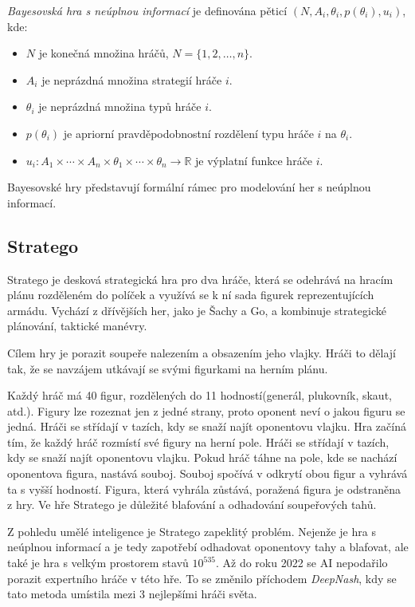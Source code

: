 \emph{Bayesovská hra s neúplnou informací} \cite{Y_Narahari} je definována pěticí $(N, A_i, \theta_i, p(\theta_i), u_i)$, kde:

\begin{itemize}
\item $N$ je konečná množina hráčů, $N = \{1, 2, \ldots, n\}$.
\item $A_i$ je neprázdná množina strategií hráče $i$.
\item $\theta_i$ je neprázdná množina typů hráče $i$.
\item $p(\theta_i)$ je apriorní pravděpodobnostní rozdělení typu hráče $i$ na $\theta_i$.
\item $u_i: A_1 \times \cdots \times A_n \times \theta_1 \times \cdots \times \theta_n \rightarrow \mathbb{R}$ je výplatní funkce hráče $i$.
\end{itemize}

Bayesovské hry představují formální rámec pro modelování her s neúplnou informací.

\subsection*{Stratego}

Stratego je desková strategická hra pro dva hráče, která se odehrává na hracím plánu rozděleném do políček a využívá se k ní sada figurek reprezentujících armádu.
Vychází z dřívějších her, jako je Šachy a Go, a kombinuje strategické plánování, taktické manévry.

Cílem hry je porazit soupeře nalezením a obsazením jeho vlajky.
Hráči to dělají tak, že se navzájem utkávají se svými figurkami na herním plánu.

Každý hráč má 40 figur, rozdělených do 11 hodností(generál, plukovník, skaut, atd.).
Figury lze rozeznat jen z jedné strany, proto oponent neví o jakou figuru se jedná.
Hráči se střídají v tazích, kdy se snaží najít oponentovu vlajku.
Hra začíná tím, že každý hráč rozmístí své figury na herní pole.
Hráči se střídají v tazích, kdy se snaží najít oponentovu vlajku.
Pokud hráč táhne na pole, kde se nachází oponentova figura, nastává souboj.
Souboj spočívá v odkrytí obou figur a vyhrává ta s vyšší hodností.
Figura, která vyhrála zůstává, poražená figura je odstraněna z hry.
Ve hře Stratego je důležité blafování a odhadování soupeřových tahů.

Z pohledu umělé inteligence je Stratego zapeklitý problém.
Nejenže je hra s neúplnou informací a je tedy zapotřebí odhadovat oponentovy tahy a blafovat, ale také je hra s velkým prostorem stavů $10^{535}$\cite{Perolat_2022}.
Až do roku 2022 se AI nepodařilo porazit expertního hráče v této hře.
To se změnilo příchodem \emph{DeepNash}\cite{Perolat_2022}, kdy se tato metoda umístila mezi 3 nejlepšími hráči světa.


